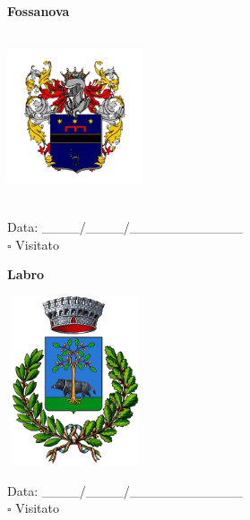 \documentclass[a5paper,12pt]{article}
\begin{document}
\vspace{0.7cm}

\noindent
\begin{minipage}[t]{0.45\textwidth}
    \begin{center}
        \textbf{Fossanova}
    \end{center}
    \vspace{-0.5cm} %
    \begin{center}
        \includegraphics[height= 5cm, width=4cm]{Lazio/Stemma Fossanova.png}
    \end{center}
    \vspace{-0.4cm} %
    \begin{flushleft}
        Data: \_\_\_\_/\_\_\_\_/\_\_\_\_\_\_\_\_\_\_\_\_ \\
        $\square$ Visitato
    \end{flushleft}
\end{minipage}
\hfill
\noindent
\begin{minipage}[t]{0.45\textwidth}
    \begin{center}
        \textbf{Labro}
    \end{center}
    \vspace{-0.5cm} %
    \begin{center}
        \includegraphics[height= 5cm, width=4cm]{Lazio/Stemma Labro.png}
    \end{center}
    \vspace{-0.4cm} %
    \begin{flushleft}
        Data: \_\_\_\_/\_\_\_\_/\_\_\_\_\_\_\_\_\_\_\_\_ \\
        $\square$ Visitato
    \end{flushleft}
\end{minipage}
\end{document}
